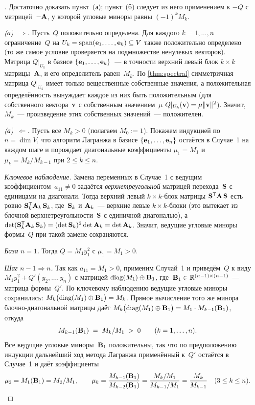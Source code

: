 \begin{proof}[]
Достаточно доказать пункт~(а); пункт~(б) следует из него применением к
$-Q$ с матрицей~$-\mathbf{A}$, у которой угловые миноры равны $(-1)^k M_k$.

\emph{(а)~$\Rightarrow$.} Пусть~$Q$ положительно определена. Для
каждого $k = 1, \dots, n$ ограничение~$Q$ на
$U_k = \operatorname{span}(\mathbf{e}_1, \dots, \mathbf{e}_k) \subseteq V$ также
положительно определено (то же самое условие проверяется на
подмножестве ненулевых векторов). Матрица $Q|_{U_k}$ в базисе
$\{\mathbf{e}_1, \dots, \mathbf{e}_k\}$~--- в точности верхний левый блок
$k \times k$ матрицы~$\mathbf{A}$, и его определитель равен~$M_k$. По
\cref{thm:spectral} симметричная матрица $Q|_{U_k}$ имеет только
вещественные собственные значения, а положительная определённость
вынуждает каждое из них быть положительным (для собственного
вектора~$\mathbf{v}$ с собственным значением~$\mu$
$Q|_{U_k}(\mathbf{v}) = \mu \|\mathbf{v}\|^2$). Значит,~$M_k$~--- произведение
этих собственных значений~--- положителен.

\emph{(а)~$\Leftarrow$.} Пусть все $M_k > 0$ (полагаем $M_0 := 1$).
Покажем индукцией по~$n = \dim V$, что алгоритм Лагранжа в базисе
$\{\mathbf{e}_1, \dots, \mathbf{e}_n\}$ остаётся в Случае~1 на каждом шаге
и порождает диагональные коэффициенты
$\mu_1 = M_1$ и $\mu_k = M_k / M_{k-1}$ при $2 \le k \le n$.

\emph{Ключевое наблюдение.} Замена переменных в Случае~1 с ведущим
коэффициентом~$a_{11} \neq 0$ задаётся \emph{верхнетреугольной}
матрицей перехода~$\mathbf{S}$ с единицами на диагонали. Тогда верхний
левый $k \times k$-блок матрицы $\mathbf{S}^{\mathsf{T}} \mathbf{A}\, \mathbf{S}$ есть
ровно $\mathbf{S}_k^{\mathsf{T}} \mathbf{A}_k\, \mathbf{S}_k$, где~$\mathbf{S}_k$ и $\mathbf{A}_k$~---
верхние левые $k \times k$-блоки (это вытекает из блочной
верхнетреугольности~$\mathbf{S}$ с единичной диагональю), а
$\det(\mathbf{S}_k^{\mathsf{T}} \mathbf{A}_k\, \mathbf{S}_k) = (\det \mathbf{S}_k)^2 \det \mathbf{A}_k = \det \mathbf{A}_k$.
Значит, ведущие угловые миноры формы~$Q$ при такой замене сохраняются.

\emph{База $n = 1$.} Тогда $Q = M_1 y_1^2$ с $\mu_1 = M_1 > 0$.

\emph{Шаг $n - 1 \Rightarrow n$.} Так как $a_{11} = M_1 > 0$, применим
Случай~1 и приведём~$Q$ к виду $M_1 y_1^2 + Q'(y_2, \dots, y_n)$ с
матрицей $\operatorname{diag}(M_1) \oplus \mathbf{B}_1$, где~$\mathbf{B}_1 \in \mathbb{R}^{(n-1) \times (n-1)}$~---
матрица формы~$Q'$. По ключевому наблюдению ведущие угловые миноры
сохранились: $M_k\bigl(\operatorname{diag}(M_1) \oplus \mathbf{B}_1\bigr) = M_k$.
Прямое вычисление того же минора блочно-диагональной матрицы даёт
$M_k\bigl(\operatorname{diag}(M_1) \oplus \mathbf{B}_1\bigr) = M_1 \cdot M_{k-1}(\mathbf{B}_1)$,
откуда
\[
  M_{k-1}(\mathbf{B}_1) \;=\; M_k / M_1 \;>\; 0
  \qquad (k = 1, \dots, n).
\]
Все ведущие угловые миноры~$\mathbf{B}_1$ положительны, так что по
предположению индукции дальнейший ход метода Лагранжа применённый
к~$Q'$ остаётся в Случае~1 и даёт коэффициенты
\[
  \mu_2 = M_1(\mathbf{B}_1) = M_2 / M_1,
  \qquad
  \mu_k = \frac{M_{k-1}(\mathbf{B}_1)}{M_{k-2}(\mathbf{B}_1)} = \frac{M_k/M_1}{M_{k-1}/M_1} = \frac{M_k}{M_{k-1}}
  \quad (3 \le k \le n).
\]


\end{proof}
